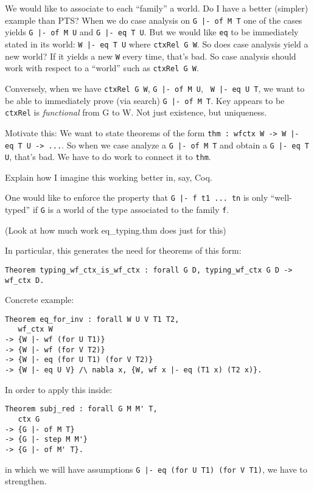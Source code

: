 \documentclass{article}
\begin{document}
We would like to associate to each ``family'' a world.
Do I have a better (simpler) example than PTS?
When we do case analysis on {\tt {G |- of M T}} one of the cases yields
{\tt {G |- of M U}} and {\tt {G |- eq T U}}. But we would like {\tt eq}
  to be immediately stated in its world: {\tt {W |- eq T U}} where
  {\tt ctxRel G W}. So does case analysis yield a new world? If it
  yields a new {\tt W} every time, that's bad. So case analysis should
  work with respect to a ``world'' such as {\tt ctxRel G W}.

Conversely, when we have {\tt ctxRel G W}, {\tt {G |- of M U}}, {\tt
  {W |- eq U T}}, we want to be able to immediately prove (via search)
{\tt {G |- of M T}}. Key appears to be {\tt ctxRel} is
\emph{functional} from G to W. Not just existence, but uniqueness.

Motivate this: We want to state theorems of the form {\tt thm : wfctx W ->
  {W |- eq T U} -> ...}. So when we case analyze a {\tt {G |- of M T}}
and obtain a {\tt {G |- eq T U}}, that's bad. We have to do work to
connect it to {\tt thm}.

Explain how I imagine this working better in, say, Coq.

One would like to enforce the property that {\tt {G |- f t1 ... tn}} is
only ``well-typed'' if {\tt G} is a world of the type associated to
the family {\tt f}. 

(Look at how much work eq\_typing.thm does just for this)

In particular, this generates the need for theorems of this form:

\begin{verbatim}
Theorem typing_wf_ctx_is_wf_ctx : forall G D, typing_wf_ctx G D -> wf_ctx D.
\end{verbatim}

Concrete example: 
\begin{verbatim}
Theorem eq_for_inv : forall W U V T1 T2,
   wf_ctx W
-> {W |- wf (for U T1)}
-> {W |- wf (for V T2)}
-> {W |- eq (for U T1) (for V T2)}
-> {W |- eq U V} /\ nabla x, {W, wf x |- eq (T1 x) (T2 x)}.
\end{verbatim}

In order to apply this inside:

\begin{verbatim}
Theorem subj_red : forall G M M' T,
   ctx G
-> {G |- of M T}
-> {G |- step M M'}
-> {G |- of M' T}.
\end{verbatim}

in which we will have assumptions
{\tt {G |- eq (for U T1) (for V T1)}}, we have to strengthen.
\end{document}
